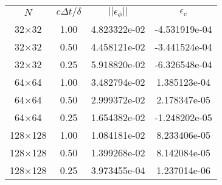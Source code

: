 \begin{tabular}{cccc}
     $N$ & $c\Delta t/\delta$  & $||\epsilon_{\phi}||$ & $\epsilon_{c}$  \\
32$\times$32 & 1.00 & 4.823322e-02 & -4.531919e-04  \\
32$\times$32 & 0.50 & 4.458121e-02 & -3.441524e-04  \\
32$\times$32 & 0.25 & 5.918820e-02 & -6.326548e-04  \\
64$\times$64 & 1.00 & 3.482794e-02 & 1.385123e-04  \\
64$\times$64 & 0.50 & 2.999372e-02 & 2.178347e-05  \\
64$\times$64 & 0.25 & 1.654382e-02 & -1.248202e-05  \\
128$\times$128 & 1.00 & 1.084181e-02 & 8.233406e-05  \\
128$\times$128 & 0.50 & 1.399268e-02 & 8.142084e-05  \\
128$\times$128 & 0.25 & 3.973455e-04 & 1.237014e-06  \\
\end{tabular}
